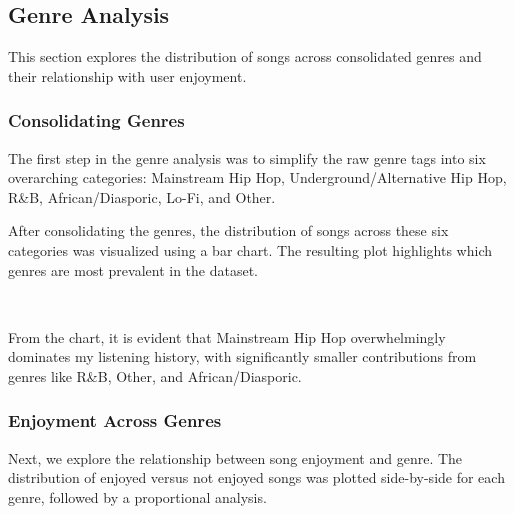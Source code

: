 \documentclass[11pt]{article}
\begin{document}
    \subsection{Genre Analysis}\label{genre-analysis}

This section explores the distribution of songs across consolidated
genres and their relationship with user enjoyment.

\subsubsection{Consolidating Genres}\label{consolidating-genres}

The first step in the genre analysis was to simplify the raw genre tags
into six overarching categories: Mainstream Hip Hop,
Underground/Alternative Hip Hop, R\&B, African/Diasporic, Lo-Fi, and
Other.

    After consolidating the genres, the distribution of songs across these
six categories was visualized using a bar chart. The resulting plot
highlights which genres are most prevalent in the dataset.

    \begin{center}
    \end{center}
    { \hspace*{\fill} \\}
    
    From the chart, it is evident that Mainstream Hip Hop overwhelmingly
dominates my listening history, with significantly smaller contributions
from genres like R\&B, Other, and African/Diasporic.

\subsubsection{Enjoyment Across Genres}\label{enjoyment-across-genres}

Next, we explore the relationship between song enjoyment and genre. The
distribution of enjoyed versus not enjoyed songs was plotted
side-by-side for each genre, followed by a proportional analysis.

    \begin{center}
    \end{center}
    { \hspace*{\fill} \\}
    
\end{document}
